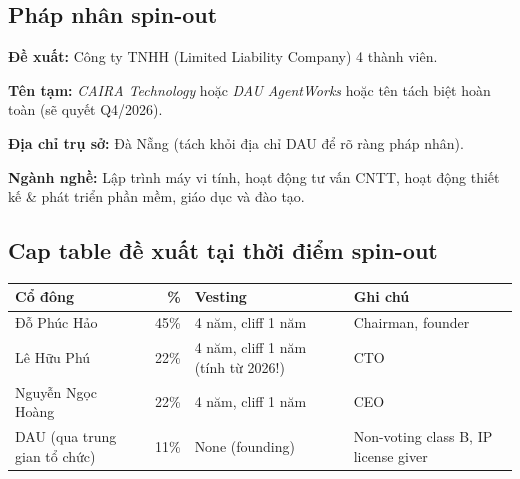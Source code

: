 \documentclass[11pt,a4paper]{article}
\begin{document}
\subsection{Pháp nhân spin-out}

\textbf{Đề xuất:} Công ty TNHH (Limited Liability Company) 4 thành viên.

\textbf{Tên tạm:} \textit{CAIRA Technology} hoặc \textit{DAU AgentWorks} hoặc
tên tách biệt hoàn toàn (sẽ quyết Q4/2026).

\textbf{Địa chỉ trụ sở:} Đà Nẵng (tách khỏi địa chỉ DAU để rõ ràng pháp nhân).

\textbf{Ngành nghề:} Lập trình máy vi tính, hoạt động tư vấn CNTT, hoạt động
thiết kế \& phát triển phần mềm, giáo dục và đào tạo.

\subsection{Cap table đề xuất tại thời điểm spin-out}

\begin{center}
\end{center}

\begin{tabularx}{\linewidth}{@{}p{2.5cm} r p{2cm} X@{}}
\toprule
\textbf{Cổ đông} & \textbf{\%} & \textbf{Vesting} & \textbf{Ghi chú} \\
\midrule
Đỗ Phúc Hảo & 45\% & 4 năm, cliff 1 năm & Chairman, founder \\
Lê Hữu Phú & 22\% & 4 năm, cliff 1 năm (tính từ 2026!) & CTO \\
Nguyễn Ngọc Hoàng & 22\% & 4 năm, cliff 1 năm & CEO \\
DAU (qua trung gian tổ chức) & 11\% & None (founding) & Non-voting class B, IP license giver \\
\bottomrule
\end{tabularx}
\end{document}
